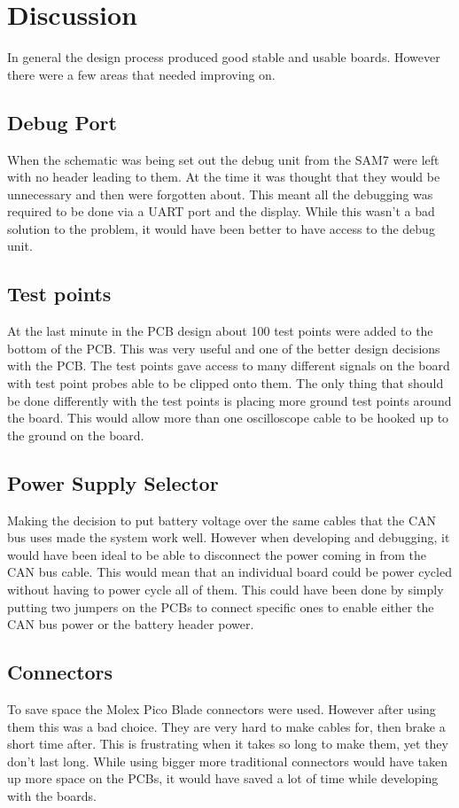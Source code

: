 \section{Discussion}
 In general the design process produced good stable and usable boards. However
 there were a few areas that needed improving on.

\subsection{Debug Port}
  When the schematic was being set out the debug unit from the SAM7 were left
  with no header leading to them. At the time it was thought that they would be
  unnecessary and then were forgotten about. This meant all the debugging was
  required to be done via a UART port and the display. While this wasn't a bad
  solution to the problem, it would have been better to have access to the debug
  unit.

\subsection{Test points}
  At the last minute in the PCB design about 100 test points were added to the
  bottom of the PCB. This was very useful and one of the better design decisions
  with the PCB. The test points gave access to many different signals on the
  board with test point probes able to be clipped onto them. The only thing that
  should be done differently with the test points is placing more ground test
  points around the board. This would allow more than one oscilloscope cable to
  be hooked up to the ground on the board.

\subsection{Power Supply Selector}
  Making the decision to put battery voltage over the same cables that the CAN
  bus uses made the system work well. However when developing and debugging, it
  would have been ideal to be able to disconnect the power coming in from the
  CAN bus cable. This would mean that an individual board could be power cycled
  without having to power cycle all of them. This could have been done by simply
  putting two jumpers on the PCBs to connect specific ones to enable either the
  CAN bus power or the battery header power.

\subsection{Connectors}
  To save space the Molex Pico Blade \cite{PicoBlade} connectors were used.
  However after using them this was a bad choice. They are very hard to make
  cables for, then brake a short time after. This is frustrating when it takes
  so long to make them, yet they don't last long. While using bigger more
  traditional connectors would have taken up more space on the PCBs, it would
  have saved a lot of time while developing with the boards.

